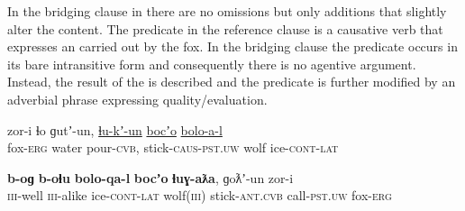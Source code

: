 \documentclass[output=paper]{LSP/langsci}
\begin{document}
In the bridging clause in  there are no omissions but only additions that slightly alter the content. The predicate in the reference clause is a causative verb that expresses an  carried out by the fox. In the bridging clause the predicate occurs in its bare intransitive form and consequently there is no agentive argument. Instead, the result of the  is described and the predicate is further modified by an adverbial phrase expressing quality/evaluation.

\begin{exe}
	\ex	\label{ex:12ab}
	\begin{xlist}
		\ex	\label{ex:12a}
		\gll	zor-i		ɬo   		ɡutʼ-un, 			\underline{ɬu-kʼ-un}     			\underline{bocʼo} 	\underline{bolo-a-l}\\
			fox-\textsc{erg} 	water 	pour-\textsc{cvb}, 	stick-\textsc{caus-pst.uw} 	wolf   	ice-\textsc{cont-lat}\\
		\glt	{}

		\ex	\label{ex:12b}
		\gll		\textbf{b-oɡ}  		\textbf{b-oɬu}  	\textbf{bolo-qa-l}    	\textbf{bocʼo} 	\textbf{ɬuɣ-aƛa},  ɡoƛʼ-un    		zor-i \\
			\textsc{iii}-well 		\textsc{iii}-alike 	ice-\textsc{cont-lat}  	wolf(\textsc{iii})   	stick-\textsc{ant.cvb} call-\textsc{pst.uw} 		fox-\textsc{erg}  \\
		\glt	{} 
	\end{xlist}
\end{exe}
\end{document}
